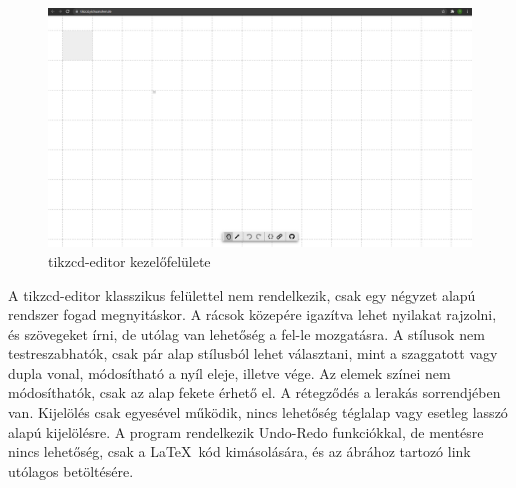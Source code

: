 \begin{figure}[!h]
	\includegraphics[width=\textwidth]{images/tikzcd.png}
	\caption{tikzcd-editor kezelőfelülete \cite{tikzcd}}
	\label{fig:tikzcd}
\end{figure}
A tikzcd-editor klasszikus felülettel nem rendelkezik, csak egy négyzet alapú rendszer fogad megnyitáskor. A rácsok közepére igazítva lehet nyilakat rajzolni, és szövegeket írni, de utólag van lehetőség a fel-le mozgatásra. A stílusok nem testreszabhatók, csak pár alap stílusból lehet választani, mint a szaggatott vagy dupla vonal, módosítható a nyíl eleje, illetve vége. Az elemek színei nem módosíthatók, csak az alap fekete érhető el. A rétegződés a lerakás sorrendjében van. Kijelölés csak egyesével működik, nincs lehetőség téglalap vagy esetleg lasszó alapú kijelölésre. A program rendelkezik Undo-Redo funkciókkal, de mentésre nincs lehetőség, csak a \LaTeX\ kód kimásolására, és az ábrához tartozó link utólagos betöltésére.

